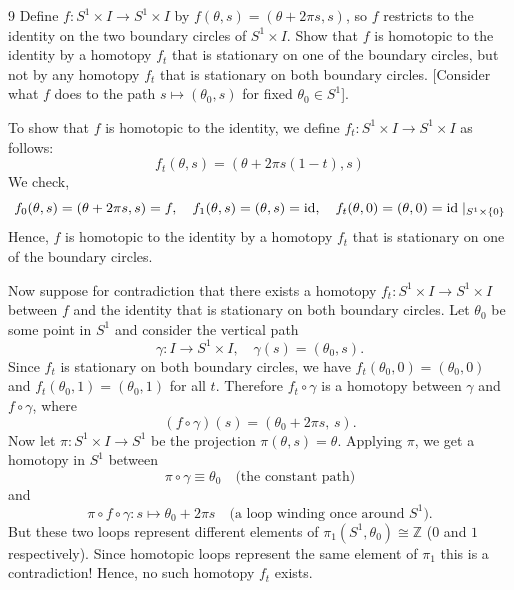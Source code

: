 \documentclass[12pt]{article}
\begin{document}
\newpage

\begin{problem}{9}
    Define $f: S^1\times I \to S^1 \times I$ by  $f (\theta, s) = (\theta + 2\pi s, s)$, so $f$ restricts to the identity on the two boundary circles of $S^1 \times I$. Show that $f$ is homotopic to the identity by a homotopy $f_t$ that is stationary on one of the boundary circles, but not by any homotopy $f_t$ that is stationary on both boundary circles. [Consider what $f$ does to the path $s \mapsto (\theta_0, s)$ for fixed $\theta_0 \in S^1$]. 
\end{problem}

\begin{solution}
    \bbni

    To show that $f$ is homotopic to the identity, we define $f_t: S^1\times I \to S^1 \times I$ as follows: 
    \[f_t(\theta, s) = (\theta + 2\pi s(1-t), s)\] 
    We check, 
    \[f_0(\theta, s) = (\theta + 2\pi s, s) = f, \quad f_1(\theta, s) = (\theta, s) = \operatorname{id}, \quad f_t(\theta, 0) = (\theta, 0) = \operatorname{id} \mid_{S^1 \times \{0\}}\]
    Hence, $f$ is homotopic to the identity by a homotopy $f_t$ that is stationary on one of the boundary circles. 

    \bbni 
   

    Now suppose for contradiction that there exists a homotopy $f_t: S^1 \times
    I \to S^1 \times I$ between $f$ and the identity that is stationary on both boundary circles. Let $\theta_0$ be some point in $S^1$ and consider the vertical path
    \[
        \gamma: I \to S^1 \times I, \quad \gamma(s) = (\theta_0, s).
    \]
    Since $f_t$ is stationary on both boundary circles, we have $f_t(\theta_0, 0) = (\theta_0, 0)$ and $f_t(\theta_0, 1) = (\theta_0, 1)$ for all $t$.
    Therefore $f_t \circ \gamma$ is a homotopy between $\gamma$ and $f \circ \gamma$, where
    \[
        (f \circ \gamma)(s) = (\theta_0 + 2\pi s,\, s).
    \]
    Now let $\pi: S^1 \times I \to S^1$ be the projection $\pi(\theta, s) =
    \theta$. Applying $\pi$, we get a homotopy in $S^1$ between
    \[
        \pi \circ \gamma \equiv \theta_0 \quad \text{(the constant path)}
    \]
    and
    \[
        \pi \circ f \circ \gamma: s \mapsto \theta_0 + 2\pi s
        \quad \text{(a loop winding once around } S^1\text{)}.
    \]
    But these two loops represent different elements of $\pi_1(S^1, \theta_0) \cong \mathbb{Z}$ ($0$ and $1$ respectively). Since homotopic loops represent the same element of $\pi_1$ this is a
    contradiction! Hence, no such homotopy $f_t$ exists. 
\end{solution}
\end{document}
